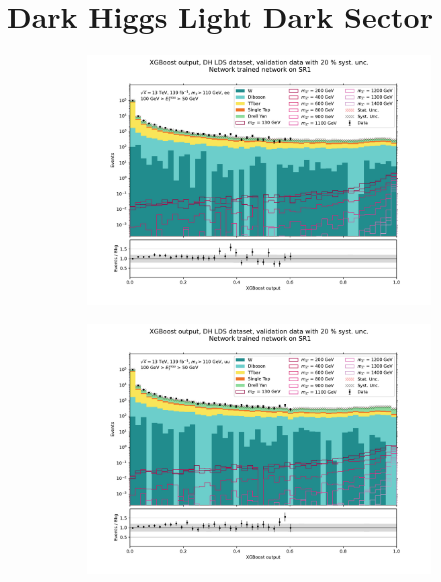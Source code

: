 \documentclass[12pt, a4paper]{book}
\begin{document}
\section{Dark Higgs Light Dark Sector}
\begin{figure}[!ht]
	\centering
	\begin{subfigure}[b]{0.49\textwidth}
      \centering
      \includegraphics[width=1\textwidth]{XGBoost/Model_independent/50-100/DH_LDS/VAL_ee.pdf}
   \end{subfigure}
   \hfill
   \begin{subfigure}[b]{0.49\textwidth}
      \centering
      \includegraphics[width=1\textwidth]{XGBoost/Model_independent/50-100/DH_LDS/VAL_uu.pdf}
   \end{subfigure}
   \hfill
   \begin{subfigure}[b]{0.49\textwidth}

\end{subfigure}
\end{figure}
\end{document}
